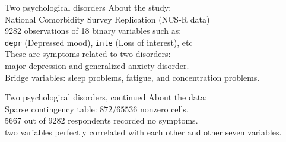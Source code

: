 \documentclass[11pt,handout,aspectratio=169,dvipsnames]{beamer}
\begin{document}
\begin{frame}{Two psychological disorders}
\alert{About the study:}\\[.5cm]
National Comorbidity Survey Replication  (NCS-R data)\\[.4cm]
9282 observations of 18 binary variables such as:\\
\texttt{depr} (Depressed mood), \texttt{inte} (Loss of interest), etc\\[.4cm]
These are symptoms related to two disorders:\\ major depression and generalized anxiety disorder.\\[.4cm]
Bridge variables: sleep problems, fatigue, and concentration problems.

\end{frame}


\begin{frame}{Two psychological disorders, continued}
\alert{About the data:}\\[.5cm]
Sparse contingency table: $872/65536$ nonzero cells. \\[.4cm]
5667 out of 9282 respondents recorded no symptoms.\\[.4cm]
two variables perfectly correlated with each other and other seven variables.\\[.4cm]
\end{frame}
\end{document}
